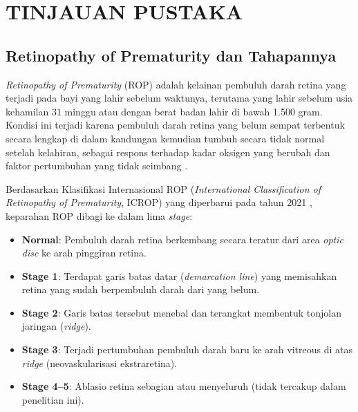 
\chapter{TINJAUAN PUSTAKA}

\section{Retinopathy of Prematurity dan Tahapannya}

\textit{Retinopathy of Prematurity} (ROP) adalah kelainan pembuluh darah retina yang terjadi
pada bayi yang lahir sebelum waktunya, terutama yang lahir sebelum usia kehamilan 31 minggu
atau dengan berat badan lahir di bawah 1.500 gram. Kondisi ini terjadi karena pembuluh darah
retina yang belum sempat terbentuk secara lengkap di dalam kandungan kemudian tumbuh secara
tidak normal setelah kelahiran, sebagai respons terhadap kadar oksigen yang berubah dan
faktor pertumbuhan yang tidak seimbang \citep{Chiang2021}.

Berdasarkan Klasifikasi Internasional ROP (\textit{International Classification of
Retinopathy of Prematurity}, ICROP) yang diperbarui pada tahun 2021 \citep{Chiang2021},
keparahan ROP dibagi ke dalam lima \textit{stage}:

\begin{itemize}
    \item \textbf{Normal}: Pembuluh darah retina berkembang secara teratur dari area \textit{optic
    disc} ke arah pinggiran retina.
    \item \textbf{Stage 1}: Terdapat garis batas datar (\textit{demarcation line}) yang
    memisahkan retina yang sudah berpembuluh darah dari yang belum.
    \item \textbf{Stage 2}: Garis batas tersebut menebal dan terangkat membentuk tonjolan
    jaringan (\textit{ridge}).
    \item \textbf{Stage 3}: Terjadi pertumbuhan pembuluh darah baru ke arah vitreous di
    atas \textit{ridge} (neovaskularisasi ekstraretina).
    \item \textbf{Stage 4--5}: Ablasio retina sebagian atau menyeluruh (tidak tercakup
    dalam penelitian ini).
\end{itemize}

